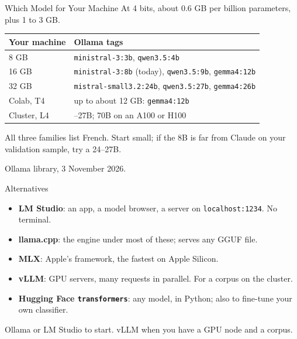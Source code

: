 \documentclass[svgnames,x11names,dvipsnames]{beamer}
\begin{document}
\begin{frame}{Which Model for Your Machine}
\small
At 4 bits, about 0.6 GB per billion parameters, plus 1 to 3 GB.

\vspace{0.3cm}
\centering
{\footnotesize
\renewcommand{\arraystretch}{1.15}
\begin{tabular}{@{}l>{\raggedright\arraybackslash}p{7.5cm}@{}}
\toprule
\textbf{Your machine} & \textbf{Ollama tags} \\
\midrule
8 GB & \texttt{ministral-3:3b}, \texttt{qwen3.5:4b} \\
16 GB & \texttt{ministral-3:8b} (today), \texttt{qwen3.5:9b}, \texttt{gemma4:12b} \\
32 GB & \texttt{mistral-small3.2:24b}, \texttt{qwen3.5:27b}, \texttt{gemma4:26b} \\
Colab, T4 & up to about 12 GB: \texttt{gemma4:12b} \\
Cluster, L4 & 26--27B; 70B on an A100 or H100 \\
\bottomrule
\end{tabular}}

\vspace{0.4cm}
\raggedright
All three families list French. Start small; if the 8B is far from Claude on your validation sample, try a 24--27B.

\vspace{0.2cm}
{\scriptsize Ollama library, 3 November 2026.}
\end{frame}

\begin{frame}{Alternatives}
\small
\begin{itemize}
    \setlength{\itemsep}{7pt}
    \item \textbf{LM Studio}: an app, a model browser, a server on \texttt{localhost:1234}. No terminal.
    \item \textbf{llama.cpp}: the engine under most of these; serves any GGUF file.
    \item \textbf{MLX}: Apple's framework, the fastest on Apple Silicon.
    \item \textbf{vLLM}: GPU servers, many requests in parallel. For a corpus on the cluster.
    \item \textbf{Hugging Face \texttt{transformers}}: any model, in Python; also to fine-tune your own classifier.
\end{itemize}

\vspace{0.6cm}
\centering
Ollama or LM Studio to start. vLLM when you have a GPU node and a corpus.
\end{frame}
\end{document}
